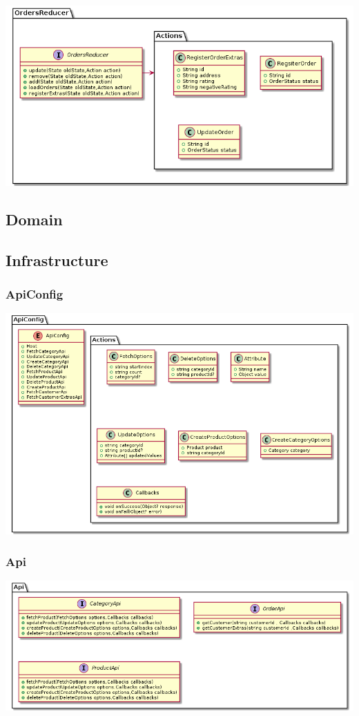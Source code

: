 \documentclass{article}
\begin{document}
\includegraphics[scale=0.5]{./out/ReactApp/Application/OrdersReducer/OrdersReducer.png}\\

\subsection{Domain}
\subsection{Infrastructure}
\subsubsection{ApiConfig}
\includegraphics[scale=0.5]{./out/ReactApp/Infrastructure/ApiConfig/ApiConfig.png}
\subsubsection{Api}
\includegraphics[scale=0.5]{./out/ReactApp/Infrastructure/Api/Api.png}
\end{document}
